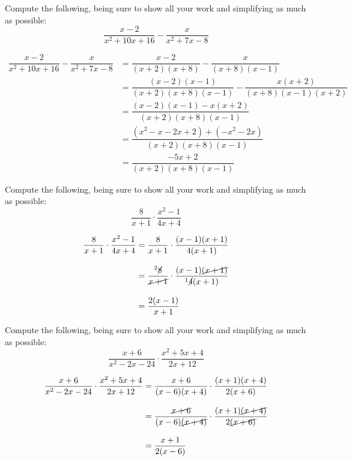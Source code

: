 \documentclass[11pt,letterpaper]{article}
\begin{document}
\newpage





 Compute the following, being sure to show all your work and simplifying as much as possible:
	\[
	\dfrac{x - 2}{x^2 + 10x + 16} - \dfrac{x}{x^2 + 7x - 8}
	\] \pspace

\sol
	\[
	\begin{aligned}
	\dfrac{x - 2}{x^2 + 10x + 16} - \dfrac{x}{x^2 + 7x - 8}&= \dfrac{x - 2}{(x + 2)(x + 8)} - \dfrac{x}{(x + 8)(x - 1)} \\[0.3cm]
	&= \dfrac{(x - 2)(x - 1)}{(x + 2)(x + 8)(x - 1)} - \dfrac{x(x + 2)}{(x + 8)(x - 1)(x + 2)} \\[0.3cm]
	&= \dfrac{(x - 2)(x - 1) - x(x + 2)}{(x + 2)(x + 8)(x - 1)} \\[0.3cm]
	&= \dfrac{(x^2 - x - 2x + 2) + (-x^2 -2x)}{(x + 2)(x + 8)(x - 1)} \\[0.3cm]
	&= \dfrac{-5x + 2}{(x + 2)(x + 8)(x - 1)} 
	\end{aligned}
	\]





\newpage





 Compute the following, being sure to show all your work and simplifying as much as possible:
	\[
	\dfrac{8}{x + 1} \cdot \dfrac{x^2 - 1}{4x + 4}
	\] \pspace

\sol
	\[
	\begin{aligned}
	\dfrac{8}{x + 1} \cdot \dfrac{x^2 - 1}{4x + 4}&= \dfrac{8}{x + 1} \cdot \dfrac{(x - 1)(x + 1)}{4(x + 1)} \\[0.3cm]
	&= \dfrac{^{2}\cancel{8}}{\cancel{x + 1}} \cdot \dfrac{(x - 1)\cancel{(x + 1)}}{^1\cancel{4}(x + 1)} \\[0.3cm]
	&= \dfrac{2(x - 1)}{x + 1}
	\end{aligned}
	\]





\newpage





 Compute the following, being sure to show all your work and simplifying as much as possible:
	\[
	\dfrac{x + 6}{x^2 - 2x - 24} \cdot \dfrac{x^2 + 5x + 4}{2x + 12}
	\] \pspace

\sol
	\[
	\begin{aligned}
	\dfrac{x + 6}{x^2 - 2x - 24} \cdot \dfrac{x^2 + 5x + 4}{2x + 12}&= \dfrac{x + 6}{(x - 6)(x + 4)} \cdot \dfrac{(x + 1)(x + 4)}{2(x + 6)} \\[0.3cm]
	&= \dfrac{\cancel{x + 6}}{(x - 6)\cancel{(x + 4)}} \cdot \dfrac{(x + 1)\cancel{(x + 4)}}{2\cancel{(x + 6)}} \\[0.3cm]
	&= \dfrac{x + 1}{2(x - 6)}
	\end{aligned}
	\]
\end{document}
